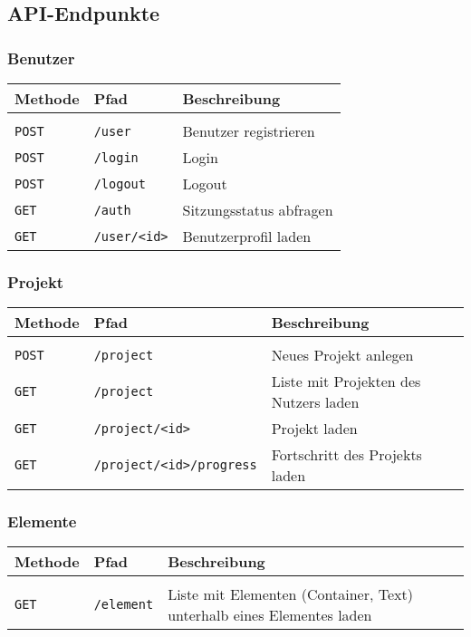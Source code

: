 \subsection{API-Endpunkte}\label{l:api-endpoints}

\subsubsection{Benutzer}

\begin{tabular}{@{}l l l}
\textbf{Methode} & \textbf{Pfad} & \textbf{Beschreibung}\\
\hline\\[-1.5ex]
\texttt{POST} & \texttt{/user} & Benutzer registrieren\\
\texttt{POST} & \texttt{/login} & Login\\
\texttt{POST} & \texttt{/logout} & Logout\\
\texttt{GET} & \texttt{/auth} & Sitzungsstatus abfragen\\
\texttt{GET} & \texttt{/user/<id>} & Benutzerprofil laden\\
\end{tabular}

\subsubsection{Projekt}

\begin{tabular}{@{}l l l}
\textbf{Methode} & \textbf{Pfad} & \textbf{Beschreibung}\\
\hline\\[-1.5ex]
\texttt{POST} & \texttt{/project} & Neues Projekt anlegen\\
\texttt{GET} & \texttt{/project} & Liste mit Projekten des Nutzers laden\\
\texttt{GET} & \texttt{/project/<id>} & Projekt laden\\
\texttt{GET} & \texttt{/project/<id>/progress} & Fortschritt des Projekts laden\\
\end{tabular}

\subsubsection{Elemente}

\begin{tabular}{@{}l l l}
\textbf{Methode} & \textbf{Pfad} & \textbf{Beschreibung}\\
\hline\\[-1.5ex]
\texttt{GET} & \texttt{/element} & Liste mit Elementen (Container, Text) unterhalb eines Elementes laden\\
\end{tabular}

